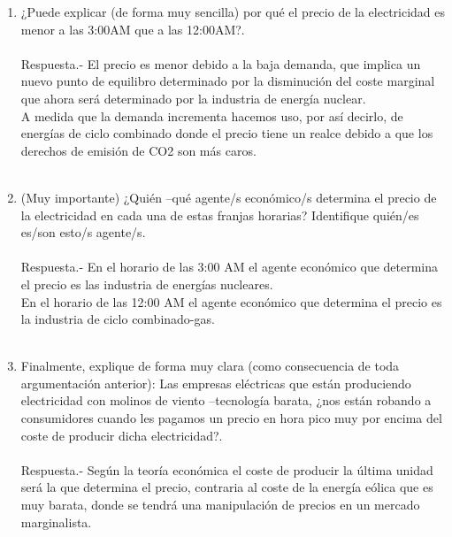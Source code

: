 \begin{enumerate}
\begin{enumerate}[\bfseries i)]
	\item  ¿Puede explicar (de forma muy sencilla) por qué el precio de la electricidad es menor a las 3:00AM que a las 12:00AM?.\\\\
	    Respuesta.-\; El precio es menor debido a la baja demanda, que implica un nuevo punto de equilibro determinado por la disminución del coste marginal que ahora será determinado por la industria de energía nuclear.\\
	    A medida que la demanda incrementa hacemos uso, por así decirlo, de energías de ciclo combinado donde el precio tiene un realce debido a que los derechos de emisión de CO2 son más caros.\\\\

	\item (Muy importante) ¿Quién –qué agente/s económico/s determina el precio de la electricidad en cada una de estas franjas horarias? Identifique quién/es es/son esto/s agente/s.\\\\
	    Respuesta.-\; En el horario de las 3:00 AM el agente económico que determina el precio es las industria de energías nucleares. \\
	    En el horario de las 12:00 AM el agente económico que determina el precio es la industria de ciclo combinado-gas.\\\\

	\item Finalmente, explique de forma muy clara (como consecuencia de toda argumentación anterior): Las empresas eléctricas que están produciendo electricidad con molinos de viento –tecnología barata, ¿nos están robando a consumidores cuando les pagamos un precio en hora pico muy por encima del coste de producir dicha electricidad?.\\\\
	    Respuesta.-\; Según la teoría económica el coste de producir la última unidad será la que determina el precio, contraria al coste de la energía eólica que es muy barata, donde se tendrá una manipulación de precios en un mercado marginalista.

    \end{enumerate}


\end{enumerate}
